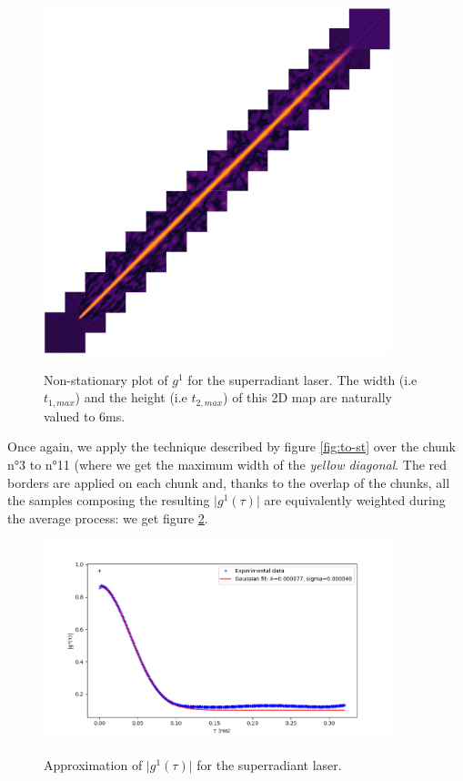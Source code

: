 \documentclass[11pt]{report}
\begin{document}
\begin{figure}[h!]
\caption{Non-stationary plot of $g^1$ for the superradiant laser. The width (i.e $t_{1, max}$) and the height (i.e $t_{2, max}$) of this 2D map are naturally valued to 6ms.}
\centering
\includegraphics[width=0.9\textwidth]{medley}
\label{fig:medley}
\end{figure}

Once again, we apply the technique described by figure \ref{fig:to-st} over the chunk n°3 to n°11 (where we get the maximum width of the \textit{yellow diagonal}. The red borders are applied on each chunk and, thanks to the overlap of the chunks, all the samples composing the resulting $\vert g^1(\tau) \vert$ are equivalently weighted during the average process: we get figure \ref{fig:sp-stat}.

\begin{figure}[h!]
\caption{Approximation of $\vert g^1(\tau) \vert$ for the superradiant laser.}
\centering
\includegraphics[width=0.9\textwidth]{sp-stat}
\label{fig:sp-stat}
\end{figure}
\end{document}
